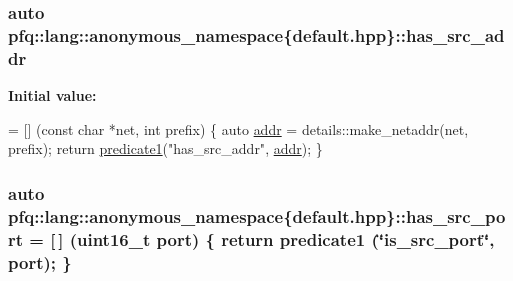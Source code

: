 \hypertarget{namespacepfq_1_1lang_1_1anonymous__namespace_02default_8hpp_03_acb03dd3e34d6dd7e83d621fa9077194c}{
\subsubsection[{has\+\_\+src\+\_\+addr}]{\setlength{\rightskip}{0pt plus 5cm}auto pfq\+::lang\+::anonymous\+\_\+namespace\{default.\+hpp\}\+::has\+\_\+src\+\_\+addr}}\label{namespacepfq_1_1lang_1_1anonymous__namespace_02default_8hpp_03_acb03dd3e34d6dd7e83d621fa9077194c}
{\bfseries Initial value\+:}
\begin{DoxyCode}
= [] (\textcolor{keyword}{const} \textcolor{keywordtype}{char} *net, \textcolor{keywordtype}{int} prefix)
        \{
            \textcolor{keyword}{auto} \hyperlink{namespacepfq_1_1lang_1_1anonymous__namespace_02default_8hpp_03_a13cabe468839119d8d68540e3c60718b}{addr} = details::make\_netaddr(net, prefix);
            \textcolor{keywordflow}{return} \hyperlink{namespacepfq_1_1lang_a3e018f096545ca95a68e67027c8e3144}{predicate1}(\textcolor{stringliteral}{"has\_src\_addr"}, \hyperlink{namespacepfq_1_1lang_1_1anonymous__namespace_02default_8hpp_03_a13cabe468839119d8d68540e3c60718b}{addr});
        \}
\end{DoxyCode}
\hypertarget{namespacepfq_1_1lang_1_1anonymous__namespace_02default_8hpp_03_a964d5ed41f50a1f3a04176f8e54d7a5a}{
\subsubsection[{has\+\_\+src\+\_\+port}]{\setlength{\rightskip}{0pt plus 5cm}auto pfq\+::lang\+::anonymous\+\_\+namespace\{default.\+hpp\}\+::has\+\_\+src\+\_\+port = \mbox{[}$\,$\mbox{]} (uint16\+\_\+t {\bf port}) \{ return {\bf predicate1} (\char`\"{}is\+\_\+src\+\_\+port\char`\"{}, port); \}}}\label{namespacepfq_1_1lang_1_1anonymous__namespace_02default_8hpp_03_a964d5ed41f50a1f3a04176f8e54d7a5a}
